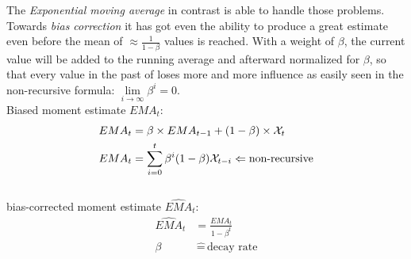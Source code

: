 \documentclass[dvipsnames,twocolumn]{scrartcl}
\begin{document}
	The \emph{Exponential moving average} in contrast is able to handle those problems. Towards \emph{bias correction} it has got even the ability to produce a great estimate even before the mean of $\approx \frac{1}{1-\beta}$ values is reached. With a weight of $\beta$, the current value will be added to the running average and afterward normalized for $\beta$, so that every value in the past of loses more and more influence as easily seen in the non-recursive formula: $\lim\limits_{i \rightarrow \infty}\beta^i = 0$.\\
	
	Biased moment estimate $EMA_{t}$:
	\begin{align*}
	EMA_{t} & = \beta\times EMA_{t-1} + (1-\beta)\times {\cal X}_{t}                          \\
	EMA_{t} & = \sum_{i=0}^{t} \beta^i(1-\beta) {\cal X}_{t-i} \Leftarrow\text{non-recursive}
	\end{align*}\\
	
	bias-corrected moment estimate $\widehat{EMA}_{t}$:
	\begin{align*}
	\widehat{EMA}_{t} & = \frac{EMA_{t}}{1-\beta^{t}}    \\
	\beta             & \,\widehat{=}\,\text{decay rate}
	\end{align*}
	
\end{document}
